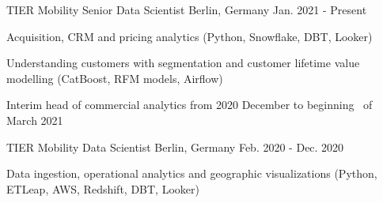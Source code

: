 
\begin{cventries}


  \cventry
    {TIER Mobility} %
    {Senior Data Scientist} %
    {Berlin, Germany} %
    {Jan. 2021 - Present} %
    {
      \begin{cvitems} %
        \item {Acquisition, CRM and pricing analytics (Python, Snowflake, DBT, Looker)}
        \item {Understanding customers with segmentation and customer lifetime
        value modelling (CatBoost, RFM models, Airflow)}
        \item {Interim head of commercial analytics from 2020 December to beginning \
        of March 2021}
      \end{cvitems}
    }

  \cventry
    {TIER Mobility} %
    {Data Scientist} %
    {Berlin, Germany} %
    {Feb. 2020 - Dec. 2020} %
    {
      \begin{cvitems} %
        \item {Data ingestion, operational analytics and geographic
        visualizations (Python, ETLeap, AWS, Redshift, DBT, Looker)}
      \end{cvitems}
    }


\end{cventries}
